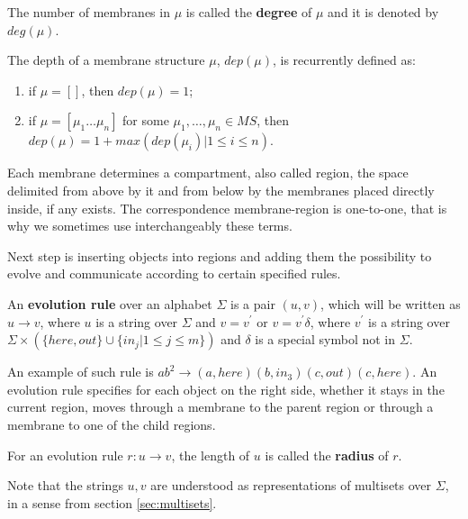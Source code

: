 \begin{definition}
  The number of membranes in $\mu$ is called the {\bf degree} of $\mu$ and it is denoted by $deg(\mu)$.
\end{definition}

\begin{definition}
  The depth of a membrane structure $\mu$, $dep(\mu)$, is recurrently defined as:
  \begin{enumerate}
    \item if $\mu = []$, then $dep(\mu) = 1$;
    \item if $\mu = [\mu_1\ldots\mu_n]$ for some $\mu_1, \ldots, \mu_n\in MS$, then $dep(\mu) = 1 + max(dep(\mu_i) | 1\leq i\leq n)$.
  \end{enumerate}
\end{definition}

Each membrane determines a compartment, also called region, the space delimited from above by it and from below by the membranes placed directly inside, if any exists. The correspondence membrane-region is one-to-one, that is why we sometimes use interchangeably these terms.


Next step is inserting objects into regions and adding them the possibility to evolve and communicate according to certain specified rules.

\begin{definition}
  An {\bf evolution rule} over an alphabet $\Sigma$ is a pair $(u,v)$, which will be written as $u\rightarrow v$, where $u$ is a string over $\Sigma$ and $v=v^\prime$ or $v=v^\prime\delta$, where $v^\prime$ is a string over $\Sigma\times(\{here, out\}\cup\{in_j|1\leq j\leq m\})$ and $\delta$ is a special symbol not in $\Sigma$.
\end{definition}

An example of such rule is $ab^2\rightarrow (a,here)(b,in_3)(c,out)(c,here)$. An evolution rule specifies for each object on the right side, whether it stays in the current region, moves through a membrane to the parent region or through a membrane to one of the child regions.

\begin{definition}
  For an evolution rule $r: u\rightarrow v$, the length of $u$ is called the {\bf radius} of $r$.
\end{definition}

Note that the strings $u, v$ are understood as representations of multisets over $\Sigma$, in a sense from section \ref{sec:multisets}.


